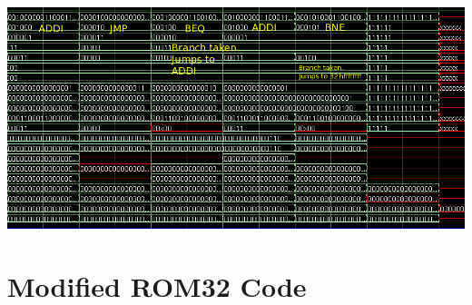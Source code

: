 \documentclass[12pt]{article}
\begin{document}
    \centerline{\includegraphics[scale=0.55]{img/test_program_wave_part3.png}}

\section{Modified ROM32 Code}
\end{document}
